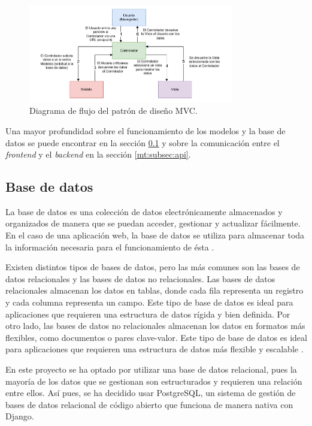\begin{figure}
    \centering
    \includegraphics[width=0.8\textwidth]{figures/theoric_frame/mvc.pdf}
    \caption{Diagrama de flujo del patrón de diseño MVC.}
    \label{fig:mvc}
\end{figure}

Una mayor profundidad sobre el funcionamiento de los modelos y la base de datos se puede encontrar en la sección \ref{mt:subsec:base_datos} y sobre la comunicación entre el \textit{frontend} y el \textit{backend} en la sección \ref{mt:subsec:api}.

\subsection{Base de datos}
\label{mt:subsec:base_datos}

La base de datos es una colección de datos electrónicamente almacenados y organizados de manera que se puedan acceder, gestionar y actualizar fácilmente. En el caso de una aplicación web, la base de datos se utiliza para almacenar toda la información necesaria para el funcionamiento de ésta \cite{aws_database}.

Existen distintos tipos de bases de datos, pero las más comunes son las bases de datos relacionales y las bases de datos no relacionales. Las bases de datos relacionales almacenan los datos en tablas, donde cada fila representa un registro y cada columna representa un campo. Este tipo de base de datos es ideal para aplicaciones que requieren una estructura de datos rígida y bien definida. Por otro lado, las bases de datos no relacionales almacenan los datos en formatos más flexibles, como documentos o pares clave-valor. Este tipo de base de datos es ideal para aplicaciones que requieren una estructura de datos más flexible y escalable \cite{aws_database_rel}.

En este proyecto se ha optado por utilizar una base de datos relacional, pues la mayoría de los datos que se gestionan son estructurados y requieren una relación entre ellos. Así pues, se ha decidido usar PostgreSQL, un sistema de gestión de bases de datos relacional de código abierto que funciona de manera nativa con Django.

